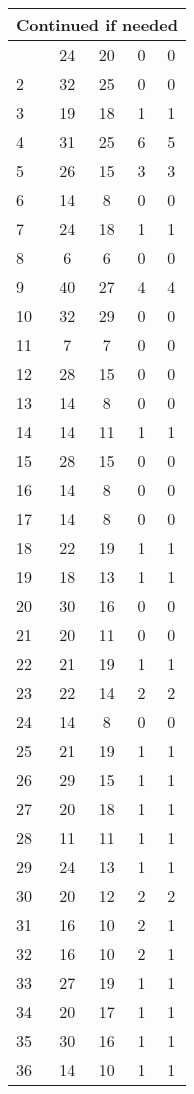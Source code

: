 \begin{center}
\begin{longtable}{l|c|c|c|c}
\hline \multicolumn{5}{|r|}{{Continued if needed}} \\ \hline
\endfoot 
1 & 24 & 20 & 0 & 0\\ \hline
2 & 32 & 25 & 0 & 0\\ \hline
3 & 19 & 18 & 1 & 1\\ \hline
4 & 31 & 25 & 6 & 5\\ \hline
5 & 26 & 15 & 3 & 3\\ \hline
6 & 14 & 8 & 0 & 0\\ \hline
7 & 24 & 18 & 1 & 1\\ \hline
8 & 6 & 6 & 0 & 0\\ \hline
9 & 40 & 27 & 4 & 4\\ \hline
10 & 32 & 29 & 0 & 0\\ \hline
11 & 7 & 7 & 0 & 0\\ \hline
12 & 28 & 15 & 0 & 0\\ \hline
13 & 14 & 8 & 0 & 0\\ \hline
14 & 14 & 11 & 1 & 1\\ \hline
15 & 28 & 15 & 0 & 0\\ \hline
16 & 14 & 8 & 0 & 0\\ \hline
17 & 14 & 8 & 0 & 0\\ \hline
18 & 22 & 19 & 1 & 1\\ \hline
19 & 18 & 13 & 1 & 1\\ \hline
20 & 30 & 16 & 0 & 0\\ \hline
21 & 20 & 11 & 0 & 0\\ \hline
22 & 21 & 19 & 1 & 1\\ \hline
23 & 22 & 14 & 2 & 2\\ \hline
24 & 14 & 8 & 0 & 0\\ \hline
25 & 21 & 19 & 1 & 1\\ \hline
26 & 29 & 15 & 1 & 1\\ \hline
27 & 20 & 18 & 1 & 1\\ \hline
28 & 11 & 11 & 1 & 1\\ \hline
29 & 24 & 13 & 1 & 1\\ \hline
30 & 20 & 12 & 2 & 2\\ \hline
31 & 16 & 10 & 2 & 1\\ \hline
32 & 16 & 10 & 2 & 1\\ \hline
33 & 27 & 19 & 1 & 1\\ \hline
34 & 20 & 17 & 1 & 1\\ \hline
35 & 30 & 16 & 1 & 1\\ \hline
36 & 14 & 10 & 1 & 1\\ \hline

\end{longtable}
\end{center}
